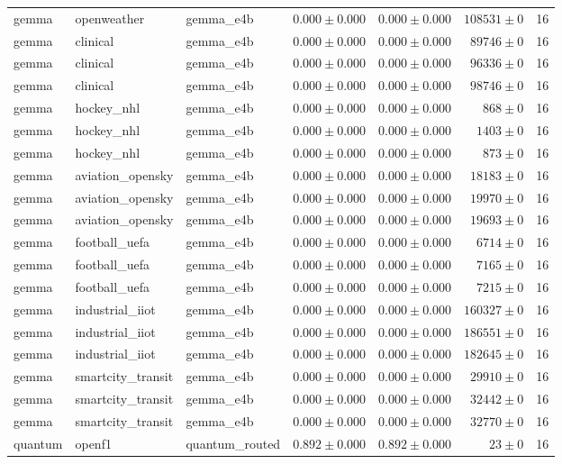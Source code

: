 \begin{table}[htbp]
\begin{tabular}{l l l r r r r}
gemma & openweather & gemma\_e4b & $0.000\pm0.000$ & $0.000\pm0.000$ & $108531\pm0$ & 16 \\
gemma & clinical & gemma\_e4b & $0.000\pm0.000$ & $0.000\pm0.000$ & $89746\pm0$ & 16 \\
gemma & clinical & gemma\_e4b & $0.000\pm0.000$ & $0.000\pm0.000$ & $96336\pm0$ & 16 \\
gemma & clinical & gemma\_e4b & $0.000\pm0.000$ & $0.000\pm0.000$ & $98746\pm0$ & 16 \\
gemma & hockey\_nhl & gemma\_e4b & $0.000\pm0.000$ & $0.000\pm0.000$ & $868\pm0$ & 16 \\
gemma & hockey\_nhl & gemma\_e4b & $0.000\pm0.000$ & $0.000\pm0.000$ & $1403\pm0$ & 16 \\
gemma & hockey\_nhl & gemma\_e4b & $0.000\pm0.000$ & $0.000\pm0.000$ & $873\pm0$ & 16 \\
gemma & aviation\_opensky & gemma\_e4b & $0.000\pm0.000$ & $0.000\pm0.000$ & $18183\pm0$ & 16 \\
gemma & aviation\_opensky & gemma\_e4b & $0.000\pm0.000$ & $0.000\pm0.000$ & $19970\pm0$ & 16 \\
gemma & aviation\_opensky & gemma\_e4b & $0.000\pm0.000$ & $0.000\pm0.000$ & $19693\pm0$ & 16 \\
gemma & football\_uefa & gemma\_e4b & $0.000\pm0.000$ & $0.000\pm0.000$ & $6714\pm0$ & 16 \\
gemma & football\_uefa & gemma\_e4b & $0.000\pm0.000$ & $0.000\pm0.000$ & $7165\pm0$ & 16 \\
gemma & football\_uefa & gemma\_e4b & $0.000\pm0.000$ & $0.000\pm0.000$ & $7215\pm0$ & 16 \\
gemma & industrial\_iiot & gemma\_e4b & $0.000\pm0.000$ & $0.000\pm0.000$ & $160327\pm0$ & 16 \\
gemma & industrial\_iiot & gemma\_e4b & $0.000\pm0.000$ & $0.000\pm0.000$ & $186551\pm0$ & 16 \\
gemma & industrial\_iiot & gemma\_e4b & $0.000\pm0.000$ & $0.000\pm0.000$ & $182645\pm0$ & 16 \\
gemma & smartcity\_transit & gemma\_e4b & $0.000\pm0.000$ & $0.000\pm0.000$ & $29910\pm0$ & 16 \\
gemma & smartcity\_transit & gemma\_e4b & $0.000\pm0.000$ & $0.000\pm0.000$ & $32442\pm0$ & 16 \\
gemma & smartcity\_transit & gemma\_e4b & $0.000\pm0.000$ & $0.000\pm0.000$ & $32770\pm0$ & 16 \\
quantum & openf1 & quantum\_routed & $0.892\pm0.000$ & $0.892\pm0.000$ & $23\pm0$ & 16 \\

\end{tabular}
\end{table}
